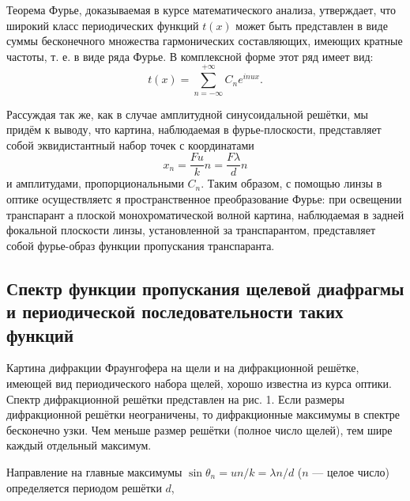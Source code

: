 \documentclass[a4paper, 14pt]{extarticle}%
\begin{document}
Теорема Фурье, доказываемая в курсе математического анализа,
утверждает, что широкий класс периодических функций $t(x)$ может
быть представлен в виде суммы бесконечного множества гармонических составляющих, имеющих кратные частоты, т. е. в виде ряда
Фурье. В
комплексной форме этот
ряд имеет вид:
\[t(x) = \sum_{n=-\infty}^{+\infty} C_n e^{inux}.\]

Рассуждая так
же,
как в случае амплитудной синусоидальной решётки, мы придём
к выводу, что
картина, наблюдаемая в фурье-плоскости,
представляет собой эквидистантный набор точек с координатами
\[x_n = \frac{Fu}{k}n = \frac{F\lambda}{d}n\]
и амплитудами, пропорциональными $C_n$. Таким образом, с помощью
линзы в оптике осуществляетс
я пространственное преобразование Фурье: при освещении транспарант
а плоской монохроматической волной
картина, наблюдаемая в задней фокальной плоскости линзы,
установленной за транспарантом, представляет собой фурье-образ функции пропускания транспаранта.

\subsection*{Спектр функции пропускания щелевой диафрагмы и периодической последовательности таких функций}

Картина дифракции Фраунгофера на щели
и на дифракционной решётке, имеющей вид периодического набора щелей,
хорошо известна из
курса оптики. Спектр дифракционной решётки представлен на рис. 1.
Если размеры дифракционной решётки неограничены, то дифракционные максимумы в спектре бесконечно узки. Чем меньше размер решётки
(полное число щелей), тем шире
каждый отдельный максимум.

Направление на главные максимумы $\sin \theta_n = un/k
= \lambda n/d$ ($n$
— целое
число) определяется периодом решётки
$d$,  
\end{document}
